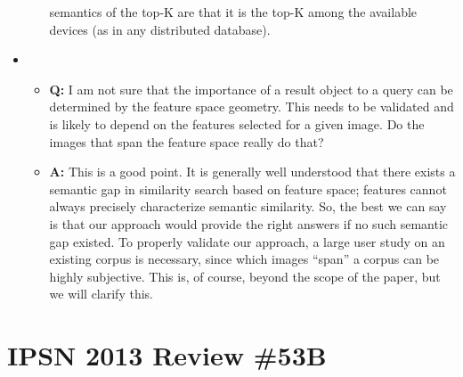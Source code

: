 \begin{itemize}
\begin{itemize}
  semantics of the top-K are that it is the top-K among the
  available devices (as in any distributed database).
\end{itemize}
\item 
\begin{itemize}
\item \textbf{Q: }I am not sure that the importance of a result object
  to a query can be determined by the feature space geometry.  This
  needs to be validated and is likely to depend on the features
  selected for a given image.  Do the images that span the feature
  space really do that?
\item \textbf{A: }This is a good point. It is generally well
  understood that there exists a semantic gap in similarity search
  based on feature space; features cannot always precisely
  characterize semantic similarity. So, the best we can say is that
  our approach would provide the right answers if no such semantic
  gap existed. To properly validate our approach, a large user study
  on an existing corpus is necessary, since which images ``span'' a
  corpus can be highly subjective. This is, of course, beyond the
  scope of the paper, but we will clarify this.
\end{itemize}
\end{itemize}


\section{IPSN 2013 Review \#53B}                  

